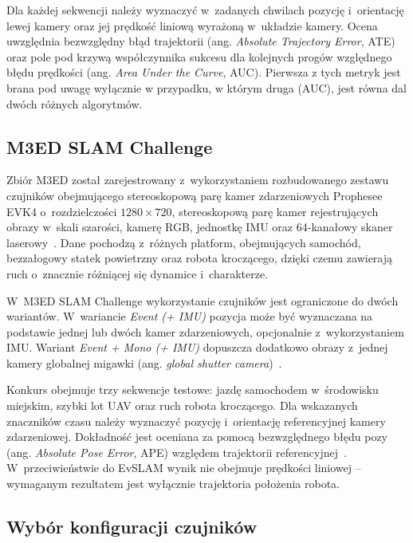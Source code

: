 Dla każdej sekwencji należy wyznaczyć w~zadanych chwilach pozycję i~orientację lewej kamery oraz jej prędkość liniową wyrażoną w~układzie kamery. Ocena uwzględnia bezwzględny błąd trajektorii (ang. \textit{Absolute Trajectory Error}, ATE) oraz pole pod krzywą współczynnika sukcesu dla kolejnych progów względnego błędu prędkości (ang. \textit{Area Under the Curve}, AUC). Pierwsza z tych metryk jest brana pod uwagę wyłącznie w przypadku, w którym druga (AUC), jest równa dal dwóch różnych algorytmów.

\subsection{M3ED SLAM Challenge}
\label{subsec: project_m3ed}

Zbiór M3ED został zarejestrowany z~wykorzystaniem rozbudowanego zestawu czujników obejmującego stereoskopową parę kamer zdarzeniowych Prophesee EVK4 o~rozdzielczości $1280\times720$, stereoskopową parę kamer rejestrujących obrazy w~skali szarości, kamerę RGB, jednostkę IMU oraz 64-kanałowy skaner laserowy~\cite{m3ed2025data}. Dane pochodzą z~różnych platform, obejmujących samochód, bezzałogowy statek powietrzny oraz robota kroczącego, dzięki czemu zawierają ruch o~znacznie różniącej się dynamice i~charakterze.

W~M3ED SLAM Challenge wykorzystanie czujników jest ograniczone do dwóch wariantów. W~wariancie \textit{Event (+ IMU)} pozycja może być wyznaczana na podstawie jednej lub dwóch kamer zdarzeniowych, opcjonalnie z~wykorzystaniem IMU. Wariant \textit{Event + Mono (+ IMU)} dopuszcza dodatkowo obrazy z~jednej kamery globalnej migawki (ang. \textit{global shutter camera})~\cite{m3ed2025challenge}.

Konkurs obejmuje trzy sekwencje testowe: jazdę samochodem w~środowisku miejskim, szybki lot UAV oraz ruch robota kroczącego. Dla wskazanych znaczników czasu należy wyznaczyć pozycję i~orientację referencyjnej kamery zdarzeniowej. Dokładność jest oceniana za pomocą bezwzględnego błędu pozy (ang. \textit{Absolute Pose Error}, APE) względem trajektorii referencyjnej~\cite{m3ed2025challenge}. W~przeciwieństwie do EvSLAM wynik nie obejmuje prędkości liniowej -- wymaganym rezultatem jest wyłącznie trajektoria położenia robota.


\subsection{Wybór konfiguracji czujników}
\label{subsec:wybor_czujnikow}

